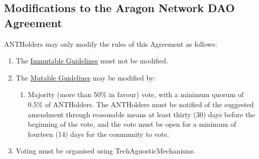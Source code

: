 \subsection{Modifications to the Aragon Network DAO Agreement}
\glspl{ANTHolder} may only modify the rules of this Agreement as follows:
\begin{enumerate}
	\item The \hyperref[sec:ImmutableGuidelines]{Immutable Guidelines} must not be modified.
	\item The \hyperref[sec:MutableGuidelines]{Mutable Guidelines} may be modified by:
	\begin{enumerate}
		\item Majority (more than 50\% in favour) vote, with a minimum quorum of 0.5\% of \glspl{ANTHolder}.
		The \glspl{ANTHolder} must be notified of the suggested amendment through reasonable means at least thirty (30) days before the beginning of the vote, and the vote must be open for a minimum of fourteen (14) days for the community to vote.
	\end{enumerate}
	\item  Voting must be organised using \gls{TechAgnosticMechanisms}.
\end{enumerate}


